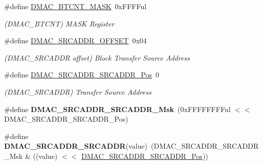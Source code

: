 \begin{DoxyCompactItemize}
\item 
\hypertarget{group___s_a_m_l21___d_m_a_c_ga9c5d07cc2ca359ffa199b12aeea23b3b}{}\#define \hyperlink{group___s_a_m_l21___d_m_a_c_ga9c5d07cc2ca359ffa199b12aeea23b3b}{D\+M\+A\+C\+\_\+\+B\+T\+C\+N\+T\+\_\+\+M\+A\+S\+K}~0x\+F\+F\+F\+Ful\label{group___s_a_m_l21___d_m_a_c_ga9c5d07cc2ca359ffa199b12aeea23b3b}

\begin{DoxyCompactList}\small\item\em (D\+M\+A\+C\+\_\+\+B\+T\+C\+N\+T) M\+A\+S\+K Register \end{DoxyCompactList}\item 
\hypertarget{group___s_a_m_l21___d_m_a_c_gac308361c580cadcfc204a8e4cc2f1be5}{}\#define \hyperlink{group___s_a_m_l21___d_m_a_c_gac308361c580cadcfc204a8e4cc2f1be5}{D\+M\+A\+C\+\_\+\+S\+R\+C\+A\+D\+D\+R\+\_\+\+O\+F\+F\+S\+E\+T}~0x04\label{group___s_a_m_l21___d_m_a_c_gac308361c580cadcfc204a8e4cc2f1be5}

\begin{DoxyCompactList}\small\item\em (D\+M\+A\+C\+\_\+\+S\+R\+C\+A\+D\+D\+R offset) Block Transfer Source Address \end{DoxyCompactList}\item 
\hypertarget{group___s_a_m_l21___d_m_a_c_ga40290c37ec5b811fa4ba560014840680}{}\#define \hyperlink{group___s_a_m_l21___d_m_a_c_ga40290c37ec5b811fa4ba560014840680}{D\+M\+A\+C\+\_\+\+S\+R\+C\+A\+D\+D\+R\+\_\+\+S\+R\+C\+A\+D\+D\+R\+\_\+\+Pos}~0\label{group___s_a_m_l21___d_m_a_c_ga40290c37ec5b811fa4ba560014840680}

\begin{DoxyCompactList}\small\item\em (D\+M\+A\+C\+\_\+\+S\+R\+C\+A\+D\+D\+R) Transfer Source Address \end{DoxyCompactList}\item 
\hypertarget{group___s_a_m_l21___d_m_a_c_gae770f9787d781e25767381401a03555e}{}\#define {\bfseries D\+M\+A\+C\+\_\+\+S\+R\+C\+A\+D\+D\+R\+\_\+\+S\+R\+C\+A\+D\+D\+R\+\_\+\+Msk}~(0x\+F\+F\+F\+F\+F\+F\+F\+Ful $<$$<$ D\+M\+A\+C\+\_\+\+S\+R\+C\+A\+D\+D\+R\+\_\+\+S\+R\+C\+A\+D\+D\+R\+\_\+\+Pos)\label{group___s_a_m_l21___d_m_a_c_gae770f9787d781e25767381401a03555e}

\item 
\hypertarget{group___s_a_m_l21___d_m_a_c_ga9fb6ec2f486852fca63e52ce1dd45b72}{}\#define {\bfseries D\+M\+A\+C\+\_\+\+S\+R\+C\+A\+D\+D\+R\+\_\+\+S\+R\+C\+A\+D\+D\+R}(value)~(D\+M\+A\+C\+\_\+\+S\+R\+C\+A\+D\+D\+R\+\_\+\+S\+R\+C\+A\+D\+D\+R\+\_\+\+Msk \& ((value) $<$$<$ \hyperlink{group___s_a_m_l21___d_m_a_c_ga40290c37ec5b811fa4ba560014840680}{D\+M\+A\+C\+\_\+\+S\+R\+C\+A\+D\+D\+R\+\_\+\+S\+R\+C\+A\+D\+D\+R\+\_\+\+Pos}))\label{group___s_a_m_l21___d_m_a_c_ga9fb6ec2f486852fca63e52ce1dd45b72}


\end{DoxyCompactItemize}
